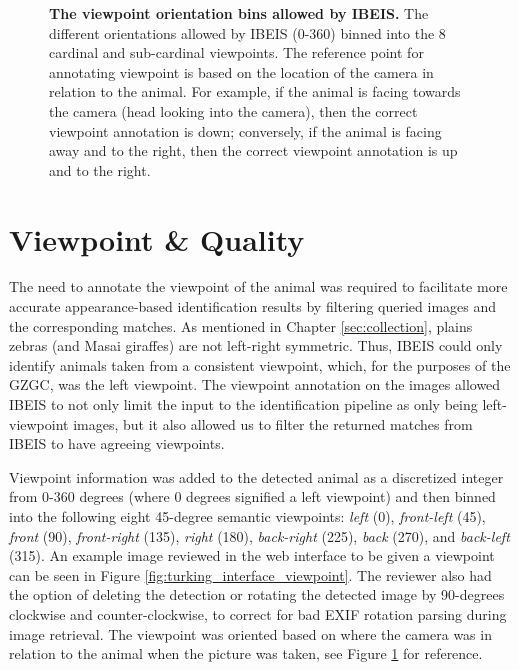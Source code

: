 \begin{figure}[t]%
	\centering
    	\caption[The Viewpoint Orientation Bins Allowed by IBEIS]{\textbf{The viewpoint orientation bins allowed by IBEIS.}  The different orientations allowed by IBEIS (0-360) binned into the 8 cardinal and sub-cardinal viewpoints.  The reference point for annotating viewpoint is based on the location of the camera in relation to the animal.  For example, if the animal is facing towards the camera (head looking into the camera), then the correct viewpoint annotation is down; conversely, if the animal is facing away and to the right, then the correct viewpoint annotation is up and to the right.}
    	\label{fig:viewpoint}
\end{figure}

\section{Viewpoint \& Quality}
The need to annotate the viewpoint of the animal was required to facilitate more accurate appearance-based identification results by filtering queried images and the corresponding matches.  As mentioned in Chapter \ref{sec:collection}, plains zebras (and Masai giraffes) are not left-right symmetric.  Thus, IBEIS could only identify animals taken from a consistent viewpoint, which, for the purposes of the GZGC, was the left viewpoint.  The viewpoint annotation on the images allowed IBEIS to not only limit the input to the identification pipeline as only being left-viewpoint images, but it also allowed us to filter the returned matches from IBEIS to have agreeing viewpoints.

Viewpoint information was added to the detected animal as a discretized integer from 0-360 degrees (where 0 degrees signified a left viewpoint) and then binned into the following eight 45-degree semantic viewpoints: \textit{left} (0), \textit{front-left} (45), \textit{front} (90), \textit{front-right} (135), \textit{right} (180), \textit{back-right} (225), \textit{back} (270), and \textit{back-left} (315).  An example image reviewed in the web interface to be given a viewpoint can be seen in Figure \ref{fig:turking_interface_viewpoint}.  The reviewer also had the option of deleting the detection or rotating the detected image by 90-degrees clockwise and counter-clockwise, to correct for bad EXIF rotation parsing during image retrieval.  The viewpoint was oriented based on where the camera was in relation to the animal when the picture was taken, see Figure \ref{fig:viewpoint} for reference.  

